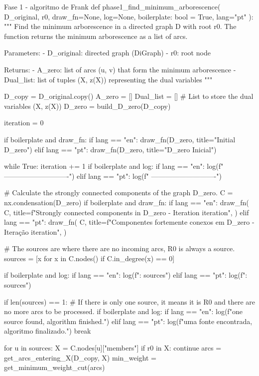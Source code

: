 \begin{pybox}{Fase 1 - algoritmo de Frank}
	def phase1_find_minimum_arborescence(
	D_original, r0, draw_fn=None, log=None, boilerplate: bool = True, lang="pt"
	):
	"""
	Find the minimum arborescence in a directed graph D with root r0.
	The function returns the minimum arborescence as a list of arcs.

	Parameters:
	- D_original: directed graph (DiGraph)
	- r0: root node

	Returns:
	- A_zero: list of arcs (u, v) that form the minimum arborescence
	- Dual_list: list of tuples (X, z(X)) representing the dual variables
	"""

	D_copy = D_original.copy()
	A_zero = []
	Dual_list = []  # List to store the dual variables (X, z(X))
	D_zero = build_D_zero(D_copy)

	iteration = 0

	if boilerplate and draw_fn:
	if lang == "en":
	draw_fn(D_zero, title="Initial D_zero")
	elif lang == "pt":
	draw_fn(D_zero, title="D_zero Inicial")

	while True:
	iteration += 1
	if boilerplate and log:
	if lang == "en":
	log(f" ----------------------------")
	elif lang == "pt":
	log(f" ----------------------------")

	# Calculate the strongly connected components of the graph D_zero.
	C = nx.condensation(D_zero)
	if boilerplate and draw_fn:
	if lang == "en":
	draw_fn(
	C,
	title=f"Strongly connected components in D_zero - Iteration {iteration}",
	)
	elif lang == "pt":
	draw_fn(
	C,
	title=f"Componentes fortemente conexos em D_zero - Iteração {iteration}",
	)

	# The sources are where there are no incoming arcs, R0 is always a source.
	sources = [x for x in C.nodes() if C.in_degree(x) == 0]

	if boilerplate and log:
	if lang == "en":
	log(f"\nSources: {sources}")
	elif lang == "pt":
	log(f"\nFontes: {sources}")

	if len(sources) == 1:
	# If there is only one source, it means it is R0 and there are no more arcs to be processed.
	if boilerplate and log:
	if lang == "en":
	log(f"\nOnly one source found, algorithm finished.")
	elif lang == "pt":
	log(f"\nApenas uma fonte encontrada, algoritmo finalizado.")
	break

	for u in sources:
	X = C.nodes[u]["members"]
	if r0 in X:
	continue
	arcs = get_arcs_entering_X(D_copy, X)
	min_weight = get_minimum_weight_cut(arcs)


\end{pybox}
